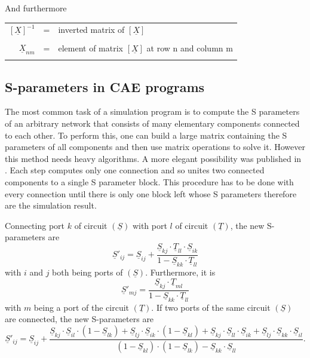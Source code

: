 \documentclass[10pt]{report}
\begin{document}
And furthermore

\addvspace{12pt}

\begin{tabular}{rll}
$\left[\underline{X}\right]^{-1}$ & = & 
inverted matrix of $\left[\underline{X}\right]$\\& &\\
$\underline{X}_{nm}$ & = & 
element of matrix $\left[\underline{X}\right]$ at row n and column m\\& &\\
\end{tabular}

\subsection{S-parameters in CAE programs}
\label{sec:SparameterCAE}

The most common task of a simulation program is to compute the S
parameters of an arbitrary network that consists of many elementary
components connected to each other.  To perform this, one can build a
large matrix containing the S parameters of all components and then
use matrix operations to solve it.  However this method needs heavy
algorithms.  A more elegant possibility was published in
\cite{Compton}. Each step computes only one connection and so unites
two connected components to a single S parameter block.  This
procedure has to be done with every connection until there is only one
block left whose S parameters therefore are the simulation result.

\addvspace{12pt}

Connecting port $k$ of circuit $(\underline{S})$ with port $l$ of
circuit $(\underline{T})$, the new S-parameters are
\begin{equation}
\underline{S}'_{ij} = \underline{S}_{ij} +
      \frac{\underline{S}_{kj}\cdot \underline{T}_{ll}\cdot \underline{S}_{ik}}
           {1-\underline{S}_{kk}\cdot \underline{T}_{ll}}
\label{eq:connectSij}
\end{equation}
with $i$ and $j$ both being ports of $(\underline{S})$.  Furthermore, it is
\begin{equation}
\underline{S}'_{mj} =
      \frac{\underline{S}_{kj}\cdot \underline{T}_{ml}}
           {1-\underline{S}_{kk}\cdot \underline{T}_{ll}}
\label{eq:connectSmj}
\end{equation}
with $m$ being a port of the circuit $(\underline{T})$.  If two ports
of the same circuit $(\underline{S})$ are connected, the new
S-parameters are
\begin{equation}
\underline{S}'_{ij} = \underline{S}_{ij} +
      \frac{ \underline{S}_{kj}\cdot \underline{S}_{il}\cdot (1-\underline{S}_{lk})
           + \underline{S}_{lj}\cdot \underline{S}_{ik}\cdot (1-\underline{S}_{kl})
           + \underline{S}_{kj}\cdot \underline{S}_{ll}\cdot \underline{S}_{ik}
           + \underline{S}_{lj}\cdot \underline{S}_{kk}\cdot \underline{S}_{il}}
           {(1-\underline{S}_{kl})\cdot (1-\underline{S}_{lk}) - \underline{S}_{kk}\cdot \underline{S}_{ll}}.
\label{eq:iconnectSij}
\end{equation}
\end{document}
